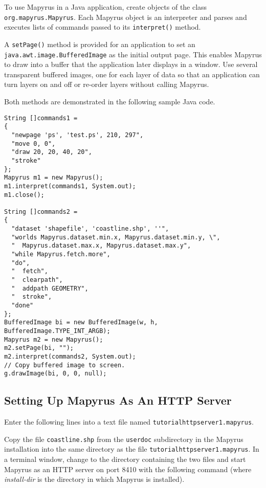 To use Mapyrus in a Java application, create objects of the class
\texttt{org.mapyrus.Mapyrus}.  Each Mapyrus object is an interpreter
and parses and executes
lists of commands passed to its \texttt{interpret()} method.

A \texttt{setPage()} method is provided for an application to set
an \texttt{java.awt.image.BufferedImage} as the initial output page.
This enables Mapyrus to draw into a buffer that the application
later displays in a window.  Use several transparent buffered images, one for
each layer of data so that an application can turn layers on and
off or re-order layers without calling Mapyrus.

Both methods are demonstrated in the following sample Java code.

\begin{verbatim}
String []commands1 =
{
  "newpage 'ps', 'test.ps', 210, 297",
  "move 0, 0",
  "draw 20, 20, 40, 20",
  "stroke"
};
Mapyrus m1 = new Mapyrus();
m1.interpret(commands1, System.out);
m1.close();

String []commands2 =
{
  "dataset 'shapefile', 'coastline.shp', ''",
  "worlds Mapyrus.dataset.min.x, Mapyrus.dataset.min.y, \",
  "  Mapyrus.dataset.max.x, Mapyrus.dataset.max.y",
  "while Mapyrus.fetch.more",
  "do",
  "  fetch",
  "  clearpath",
  "  addpath GEOMETRY",
  "  stroke",
  "done"
};
BufferedImage bi = new BufferedImage(w, h, BufferedImage.TYPE_INT_ARGB);
Mapyrus m2 = new Mapyrus();
m2.setPage(bi, "");
m2.interpret(commands2, System.out);
// Copy buffered image to screen.
g.drawImage(bi, 0, 0, null);
\end{verbatim}

\subsection{Setting Up Mapyrus As An HTTP Server}
\label{tutorialhttpserver}

Enter the following lines into a text file named
\texttt{tutorialhttpserver1.mapyrus}.



Copy the file \texttt{coastline.shp} from the \texttt{userdoc}
subdirectory in the
Mapyrus installation into the same directory as the file
\texttt{tutorialhttpserver1.mapyrus}.  In a terminal window, change to the
directory containing the two files and start Mapyrus as an HTTP server on port
8410 with the following command
(where \textit{install-dir} is the directory in which Mapyrus is installed).

